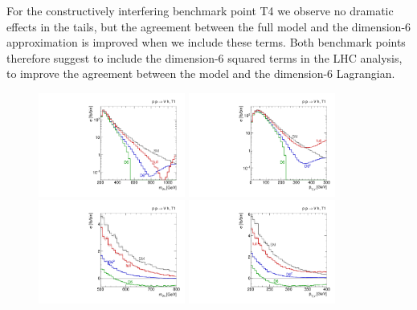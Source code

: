 For the constructively interfering benchmark point T4 we observe no
dramatic effects in the tails, but the agreement between the full
model and the dimension-6 approximation is improved when we include
these terms. Both benchmark points therefore suggest to include the
dimension-6 squared terms in the LHC analysis, to improve the
agreement between the model and the dimension-6 Lagrangian.

\begin{figure}[t]
  \includegraphics[width=0.43\textwidth]{fig/validity/VH_T1_mVH.pdf}
  \hspace*{0.05\textwidth}
  \includegraphics[width=0.43\textwidth]{fig/validity/VH_T1_Vpt.pdf} \\
  \includegraphics[width=0.43\textwidth]{fig/validity/VH_T1_mVH_zoom.pdf} 
  \hspace*{0.05\textwidth}
  \includegraphics[width=0.43\textwidth]{fig/validity/VH_T1_Vpt_zoom} \\

\end{figure}
